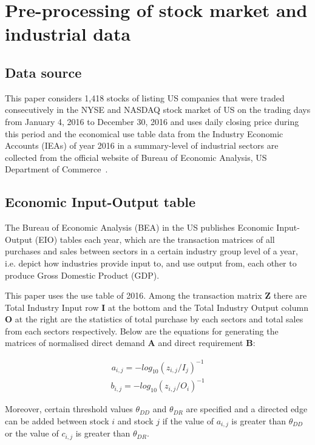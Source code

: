 \chapter[Pre-processing of data]{Pre-processing of stock market and industrial data}
\section{Data source}
This paper considers 1,418 stocks of listing US companies that were traded consecutively in the NYSE and NASDAQ stock market of US on the trading days from January 4, 2016 to December 30, 2016 and uses daily closing price during this period and the economical use table data from the Industry Economic Accounts (IEAs) of year 2016 in a summary-level of industrial sectors are collected from the official website of Bureau of Economic Analysis, US Department of Commerce~\cite{bea}.

\section{Economic Input-Output table}
The Bureau of Economic Analysis (BEA) in the US publishes Economic Input-Output (EIO) tables each year, which are the transaction matrices of all purchases and sales between sectors in a certain industry group level of a year, i.e. depict how industries provide input to, and use output from, each other to produce Gross Domestic Product (GDP).

This paper uses the use table of 2016. Among the transaction matrix \textbf{Z} there are Total Industry Input row \textbf{I} at the bottom and the Total Industry Output column \textbf{O} at the right are the statistics of total purchase by each sectors and total sales from each sectors respectively. Below are the equations for generating the matrices of normalised direct demand \textbf{A} and direct requirement \textbf{B}:

\begin{eqnarray}\label{equ:eio_i}
a_{i,j} = -log_{10}(z_{i,j} / I_j)^{-1}
\end{eqnarray}
\begin{eqnarray}\label{equ:eio_o}
b_{i,j} = -log_{10}(z_{i,j} / O_i)^{-1}
\end{eqnarray}

Moreover, certain threshold values $\theta_{DD}$ and $\theta_{DR}$ are specified and a directed edge can be added between stock $i$ and stock $j$ if the value of $a_{i,j}$ is greater than $\theta_{DD}$ or the value of $c_{i,j}$ is greater than $\theta_{DR}$.

